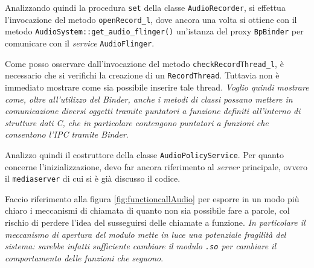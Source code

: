 	Analizzando quindi la procedura \texttt{\small set} della
	classe \texttt{\small AudioRecorder}, si effettua l'invocazione del metodo
	\texttt{\small openRecord\_l}, dove ancora una volta 
	si ottiene con il metodo \texttt{\small AudioSystem::get\_audio\_flinger()}
	un'istanza del proxy \texttt{\small BpBinder} per comunicare con il \textit{service}
	\texttt{\small AudioFlinger}.
	
	Come posso osservare dall'invocazione del metodo \texttt{\small checkRecordThread\_l},
	è necessario che si verifichi la creazione di un \texttt{\small RecordThread}.
Tuttavia non è immediato mostrare come sia possibile inserire tale thread.
\textit{Voglio quindi mostrare come, oltre all'utilizzo del Binder, anche i metodi
di classi possano mettere in comunicazione diversi oggetti tramite puntatori 
a funzione definiti all'interno di strutture dati C, che in particolare
contengono puntatori a funzioni che consentono l'IPC tramite Binder}.
\medskip

Analizzo quindi il costruttore della classe \texttt{\small AudioPolicyService}.
Per quanto concerne l'inizializzazione, devo far ancora riferimento al \textit{server}
principale, ovvero il \texttt{\small mediaserver} di cui si è già discusso il codice.

Faccio riferimento alla figura \vref{fig:functioncallAudio} per esporre in 
un modo più chiaro i meccanismi di chiamata di quanto non sia possibile fare
a parole, col rischio di perdere l'idea del susseguirsi delle chiamate a funzione.
\textit{In particolare il meccanismo di apertura del modulo mette in luce una potenziale
fragilità del sistema: sarebbe infatti sufficiente cambiare il modulo \texttt{\small .so} per 
cambiare il comportamento delle funzioni che seguono}.

